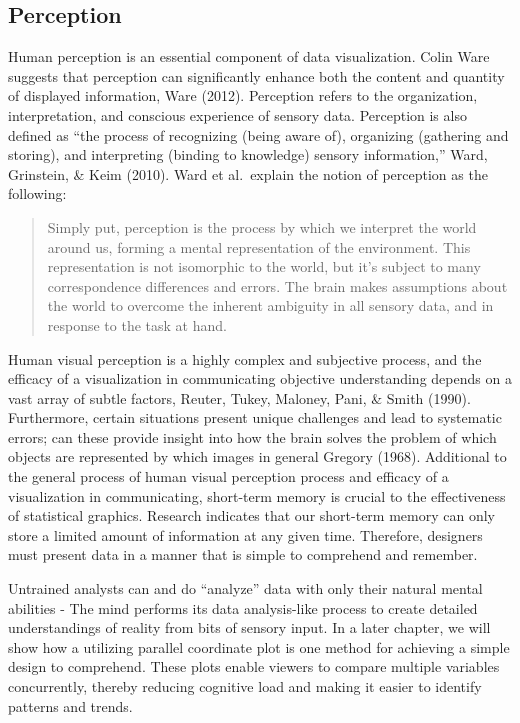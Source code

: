 \documentclass[print]{nuthesis}
\begin{document}
\hypertarget{perception}{%
\subsection{Perception}\label{perception}}

Human perception is an essential component of data visualization.
Colin Ware suggests that perception can significantly enhance both the content and quantity of displayed information, Ware (2012).
Perception refers to the organization, interpretation, and conscious experience of sensory data.
Perception is also defined as ``the process of recognizing (being aware of), organizing (gathering and storing), and interpreting (binding to knowledge) sensory information,'' Ward, Grinstein, \& Keim (2010).
Ward et al.~explain the notion of perception as the following:

\begin{quote}
Simply put, perception is the process by which we interpret the world around us, forming a mental representation of the environment. This representation is not isomorphic to the world, but it's subject to many correspondence differences and errors. The brain makes assumptions about the world to overcome the inherent ambiguity in all sensory data, and in response to the task at hand.
\end{quote}

Human visual perception is a highly complex and subjective process, and the efficacy of a visualization in communicating objective understanding depends on a vast array of subtle factors, Reuter, Tukey, Maloney, Pani, \& Smith (1990).
Furthermore, certain situations present unique challenges and lead to systematic errors; can these provide insight into how the brain solves the problem of which objects are represented by which images in general Gregory (1968).
Additional to the general process of human visual perception process and efficacy of a visualization in communicating, short-term memory is crucial to the effectiveness of statistical graphics.
Research indicates that our short-term memory can only store a limited amount of information at any given time.
Therefore, designers must present data in a manner that is simple to comprehend and remember.

Untrained analysts can and do ``analyze'' data with only their natural mental abilities - The mind performs its data analysis-like process to create detailed understandings of reality from bits of sensory input.
In a later chapter, we will show how a utilizing parallel coordinate plot is one method for achieving a simple design to comprehend.
These plots enable viewers to compare multiple variables concurrently, thereby reducing cognitive load and making it easier to identify patterns and trends.
\end{document}
